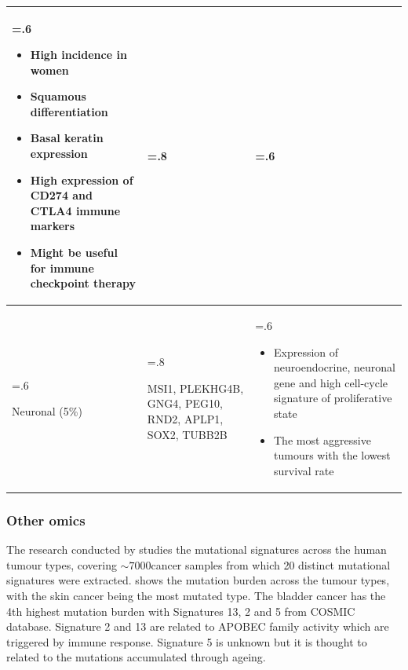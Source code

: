\begin{table}[htbp]
\begin{tabularx}{\textwidth}{
  >{\hsize=.6\hsize\raggedright\arraybackslash}X
  >{\hsize=.8\hsize\raggedright\arraybackslash}X
  >{\hsize=.6\hsize\arraybackslash}X
}
\begin{itemize}[leftmargin=*, nosep, after=\vspace{-\baselineskip}, before=\vspace{-.6\baselineskip}]
    \item High incidence in women
    \item Squamous differentiation
    \item Basal keratin expression
    \item High expression of CD274 and CTLA4 immune markers
    \item Might be useful for immune checkpoint therapy
\end{itemize} \\
\midrule
Neuronal (5\%) & MSI1, PLEKHG4B, GNG4, PEG10, RND2, APLP1, SOX2, TUBB2B & 
\begin{itemize}[leftmargin=*, nosep, after=\vspace{-\baselineskip}, before=\vspace{-.6\baselineskip}]
    \item Expression of neuroendocrine, neuronal gene and high cell-cycle signature of proliferative state
    \item The most aggressive tumours with the lowest survival rate
\end{itemize} \\
\bottomrule
\end{tabularx}
\end{table}

\subsubsection{Other omics}

The research conducted by \citet{Alexandrov2013-gi} studies the mutational signatures across the human tumour types, covering $\sim7000 $cancer samples from which 20 distinct mutational signatures were extracted.  shows the mutation burden across the tumour types, with the skin cancer being the most mutated type. The bladder cancer has the 4th highest mutation burden with Signatures 13, 2 and 5 from COSMIC database\cite{Tate2019-yj}. Signature 2 and 13 are related to APOBEC family activity which are triggered by immune response. Signature 5 is unknown but it is thought to related to the mutations accumulated through ageing. 

